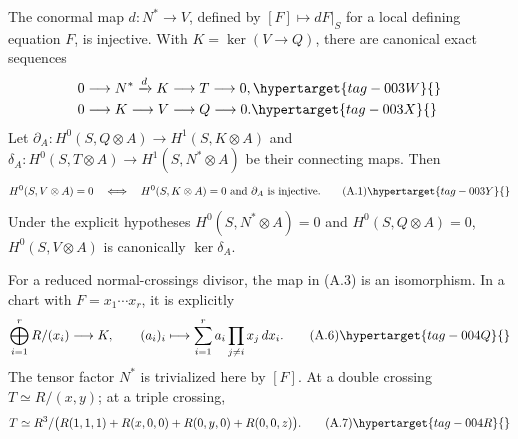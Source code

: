 
\begin{proposition}\hypertarget{tag-01AD}{}\label{cdp:st:A.1.1}
\label{wbII:prop:criterion}\label{wbII:prop:filtration}\label{wbII:lem:conormal}\label{wbII:lem:conormal-injective}\label{wbII:prop:missing-global-section-criterion}\label{wbII:prop:missing-cotangent-filtration}
The conormal map $d:N^*\to V$, defined by $[F]\mapsto dF|_S$ for a local defining equation $F$, is injective. With $K=\ker(V\to Q)$, there are canonical exact sequences
\begin{align}
0&\longrightarrow N^*\xrightarrow{d}K\longrightarrow T\longrightarrow0,
\hypertarget{tag-003W}{}\label{cdp:A:filtration1}\\
0&\longrightarrow K\longrightarrow V\longrightarrow Q\longrightarrow0.
\hypertarget{tag-003X}{}\label{cdp:A:filtration2}
\end{align}
Let $\partial_A:H^0(S,Q\otimes A)\to H^1(S,K\otimes A)$ and $\delta_A:H^0(S,T\otimes A)\to H^1(S,N^*\otimes A)$ be their connecting maps. Then
\[
 H^0(S,V\otimes A)=0
 \quad\Longleftrightarrow\quad
 H^0(S,K\otimes A)=0\ \hbox{and}\ \partial_A\hbox{ is injective}.
\tag{A.1}\hypertarget{tag-003Y}{}\label{cdp:eq:A.1}
\]
Under the explicit hypotheses $H^0(S,N^*\otimes A)=0$ and $H^0(S,Q\otimes A)=0$, $H^0(S,V\otimes A)$ is canonically $\ker\delta_A$.
\end{proposition}

\begin{proposition}\hypertarget{tag-01AE}{}\label{cdp:st:A.1.2}

For a reduced normal-crossings divisor, the map in (A.3) is an isomorphism. In a chart with $F=x_1\cdots x_r$, it is explicitly
\[
 \bigoplus_{i=1}^r R/(x_i)\longrightarrow K,
 \qquad (a_i)_i\longmapsto
 \sum_{i=1}^r a_i\prod_{j\ne i}x_j\,dx_i.
\tag{A.6}\hypertarget{tag-004Q}{}\label{cdp:eq:A.6}
\]
The tensor factor $N^*$ is trivialized here by $[F]$. At a double crossing $T\simeq R/(x,y)$; at a triple crossing,
\[
 T\simeq R^3/\bigl(R(1,1,1)+R(x,0,0)+R(0,y,0)+R(0,0,z)\bigr).
\tag{A.7}\hypertarget{tag-004R}{}\label{cdp:eq:A.7}
\]
\end{proposition}

